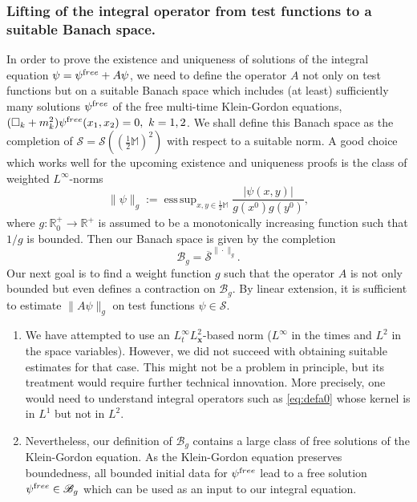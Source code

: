 \documentclass[b5paper,draft,openbib,12pt]{memoir}
\newenvironment{Remarks}[1][Remarks:]{\begin{trivlist}
\item[\hskip \labelsep {\bfseries #1}]}{\end{trivlist}}
\newcommand{\R}{\mathbb{R}}
\newcommand{\M}{\mathbb{M}}
\newcommand{\vx}{\mathbf{x}}
\newcommand{\free}{{\textup free}}
\newcommand{\Banach}{\mathscr{B}}
\DeclareMathOperator*{\esssup}{ess \, sup}
\begin{document}
\subsubsection{Lifting of the integral operator from test 
functions to a suitable Banach space.}
In order to prove the existence and uniqueness of solutions 
of the integral equation $\psi = \psi^\free + A\psi$, we need 
to define the operator $A$ not only on test functions but on a 
suitable Banach space which includes (at least) sufficiently many 
solutions $\psi^\free$ of the free multi-time Klein-Gordon equations, 
$(\Box_k + m_k^2)\psi^\free(x_1,x_2) = 0,~k=1,2$. 
We shall define this Banach space as the completion of 
$\mathcal{S} =\mathcal{S}((\tfrac{1}{2}\M)^2)$ with respect to a 
suitable norm. A good choice which works well for the upcoming 
existence and uniqueness proofs is the class of weighted 
$L^\infty$-norms
\begin{equation}
	\| \psi \|_g := \esssup_{x,y \in \tfrac{1}{2}\M} \frac{|\psi(x,y)|}{g(x^0)g(y^0)},
\end{equation}
where $g : \R^+_0 \rightarrow \R^+$ is assumed to be a monotonically 
increasing function such that $1/g$ is bounded. Then our Banach space 
is given by the completion
\begin{equation}
	\Banach_g = \overline{\mathcal{S}}^{\| \cdot \|_g}.
\end{equation}
Our next goal is to find a weight function $g$ such that the operator 
$A$ is not only bounded but even defines a contraction on $\Banach_g$. 
By linear extension, it is sufficient to estimate $\| A \psi \|_g$ 
on test functions $\psi \in \mathcal{S}$.

\begin{Remarks}
	\begin{enumerate}
    \item We have attempted to use an $L^\infty_t L^2_\vx$-based norm 
    ($L^\infty$ in the times and $L^2$ in the space variables). 
    However, we did not succeed with obtaining suitable estimates 
  for that case. This might not be a problem in principle, but its 
  treatment would require further technical innovation.
More precisely, one would need to understand integral operators such 
as \eqref{eq:defa0} whose kernel is in $L^1$ but not in $L^2$.
    \item Nevertheless, our definition of $\Banach_g$ contains a 
    large class of free solutions of the Klein-Gordon equation. As 
    the Klein-Gordon equation preserves boundedness, all bounded 
    initial data for $\psi^\free$ lead to a free solution $\psi^\free 
    \in \Banach_g$ which can be used as an input to our integral 
    equation.
	\end{enumerate}
\end{Remarks}
\end{document}
